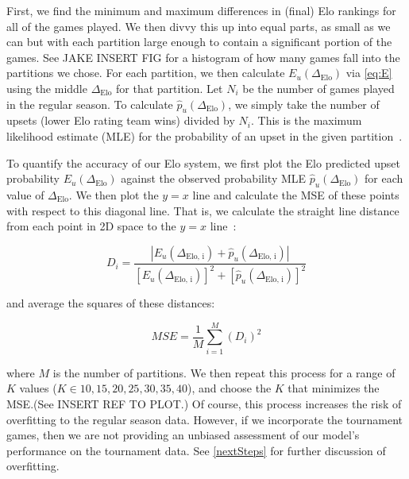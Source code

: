 \documentclass{article}
\begin{document}
First, we find the minimum and maximum differences in (final) Elo rankings for all of the games played. We then divvy this up into equal parts, as small as we can but with each partition large enough to contain a significant portion of the games. See JAKE INSERT FIG for a histogram of how many games fall into the partitions we chose. For each partition, we then calculate $E_u(\Delta_{\text{Elo}})$ via \autoref{eq:E} using the middle $\Delta_{\text{Elo}}$ for that partition. Let $N_i$ be the number of games played in the regular season. To calculate $\hat{p}_u(\Delta_{\text{Elo}})$, we simply take the number of upsets (lower Elo rating team wins) divided by $N_i$. This is the maximum likelihood estimate (MLE) for the probability of an upset in the given partition~\cite{statproofbookMaximumLikelihood}.

To quantify the accuracy of our Elo system, we first plot the Elo predicted upset probability $E_u(\Delta_{\text{Elo}})$ against the observed probability MLE $\hat{p}_u(\Delta_{\text{Elo}})$ for each value of $\Delta_{\text{Elo}}$. We then plot the $y=x$ line and calculate the MSE of these points with respect to this diagonal line. That is, we calculate the straight line distance from each point in 2D space to the $y=x$ line~\cite{enwiki:1235411332}:

\[
D_i = \frac{|E_u(\Delta_{\text{Elo, i}}) + \hat{p}_u(\Delta_{\text{Elo, i}})|}{{[E_u(\Delta_{\text{Elo, i}})]}^2+{[\hat{p}_u(\Delta_{\text{Elo, i}})]}^2}
\]

and average the squares of these distances:

\[
MSE = \frac{1}{M}\sum_{i=1}^M {(D_i)}^2
\]

where $M$ is the number of partitions. We then repeat this process for a range of $K$ values ($K \in {10, 15, 20, 25, 30, 35, 40}$), and choose the $K$ that minimizes the MSE.\@ (See INSERT REF TO PLOT.) Of course, this process increases the risk of overfitting to the regular season data. However, if we incorporate the tournament games, then we are not providing an unbiased assessment of our model's performance on the tournament data. See \autoref{nextSteps} for further discussion of overfitting.
\end{document}
